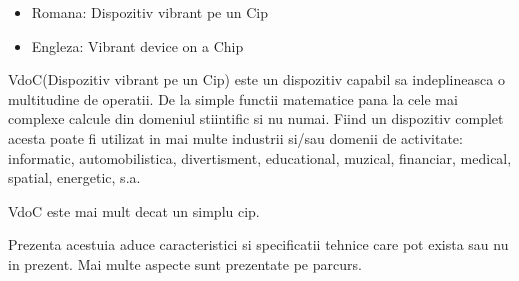 \setlength{\parindent}{0.8cm}
\begin{itemize}
\item Romana: Dispozitiv vibrant pe un Cip
\item Engleza: Vibrant device on a Chip
\end{itemize}

VdoC(Dispozitiv vibrant pe un Cip) este un dispozitiv capabil sa indeplineasca
o multitudine de operatii. De la simple functii matematice pana la cele mai complexe calcule
din domeniul stiintific si nu numai. Fiind un dispozitiv complet acesta poate fi utilizat in
mai multe industrii si/sau domenii de activitate: informatic, automobilistica, divertisment,
educational, muzical, financiar, medical, spatial, energetic, s.a.

VdoC este mai mult decat un simplu cip.

Prezenta acestuia aduce caracteristici si specificatii tehnice care pot exista sau nu in prezent.
Mai multe aspecte sunt prezentate pe parcurs.
